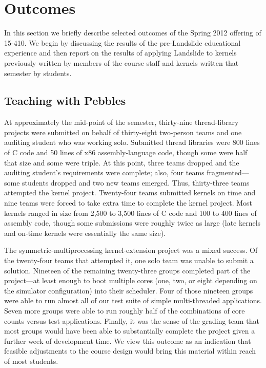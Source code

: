 \section{Outcomes}

In this section we briefly describe selected
outcomes of the Spring 2012 offering of 15-410.
We begin by discussing the results of the
pre-Landslide educational experience and then
report on the results of applying Landslide to
kernels previously written by members of the course staff
and kernels written that semester by students.

\subsection{Teaching with Pebbles}

At approximately the mid-point of the semester,
thirty-nine thread-library projects were submitted
on behalf of thirty-eight two-person teams and one
auditing student who was working solo.
%
Submitted thread libraries were 800 lines of C code
and 50 lines of x86 assembly-language code,
though some were half that size and some were triple.
%
At this point, three teams dropped and the auditing
student's requirements were complete;
also, four teams fragmented---some students dropped and
two new teams emerged.
Thus, thirty-three teams attempted the kernel project.
%
Twenty-four teams submitted kernels on time and nine
teams were forced to take extra time to complete the
kernel project.
Most kernels ranged in size from 2,500 to 3,500 lines
of C code and 100 to 400 lines of assembly code,
though some submissions were roughly twice as large
(late kernels and on-time kernels were essentially the
same size).


The symmetric-multiprocessing kernel-extension project
was a mixed success.
Of the twenty-four teams that attempted it,
one solo team was unable to submit a solution.
Nineteen of the remaining twenty-three groups
completed part of the project---at least enough to
boot multiple cores (one, two, or eight depending
on the simulator configuration) into their scheduler.
Four of those nineteen groups were able to run
almost all of our test suite of simple multi-threaded
applications.
Seven more groups were able to run roughly half of
the combinations of core counts versus test applications.
Finally, it was the sense of the grading team that
most groups would have been able to substantially complete
the project given a further week of development time.
We view this outcome as an indication that feasible adjustments
to the course design would bring this material within reach
of most students.

